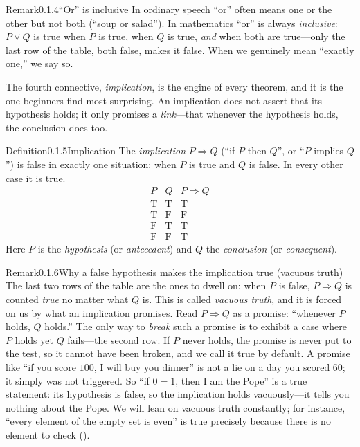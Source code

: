 \documentclass[main.tex]{subfiles}
\begin{document}
\begin{ObjL}{Remark}{0.1.4}{``Or'' is inclusive}
In ordinary speech ``or'' often means one or the other but not both (``soup or salad''). In
mathematics ``or'' is always \emph{inclusive}: $P\vee Q$ is true when $P$ is true, when $Q$ is true,
\emph{and} when both are true---only the last row of the table, both false, makes it false. When we
genuinely mean ``exactly one,'' we say so.
\end{ObjL}

\noindent The fourth connective, \emph{implication}, is the engine of every theorem, and it is the
one beginners find most surprising. An implication does not assert that its hypothesis holds; it only
promises a \emph{link}---that whenever the hypothesis holds, the conclusion does too.

\begin{Obj}{Definition}{0.1.5}{Implication}
The \emph{implication} $P\Rightarrow Q$ (``if $P$ then $Q$'', or ``$P$ implies $Q$'') is false in
exactly one situation: when $P$ is true and $Q$ is false. In every other case it is true.
\[
\begin{array}{cc|c}
P & Q & P\Rightarrow Q\\\hline
\mathrm{T}&\mathrm{T}&\mathrm{T}\\
\mathrm{T}&\mathrm{F}&\mathrm{F}\\
\mathrm{F}&\mathrm{T}&\mathrm{T}\\
\mathrm{F}&\mathrm{F}&\mathrm{T}
\end{array}
\]
Here $P$ is the \emph{hypothesis} (or \emph{antecedent}) and $Q$ the \emph{conclusion} (or
\emph{consequent}).
\end{Obj}

\begin{ObjL}{Remark}{0.1.6}{Why a false hypothesis makes the implication true (vacuous truth)}
The last two rows of the table are the ones to dwell on: when $P$ is false, $P\Rightarrow Q$ is
counted \emph{true} no matter what $Q$ is. This is called \emph{vacuous truth}, and it is forced on
us by what an implication promises. Read $P\Rightarrow Q$ as a promise: ``whenever $P$ holds, $Q$
holds.'' The only way to \emph{break} such a promise is to exhibit a case where $P$ holds yet $Q$
fails---the second row. If $P$ never holds, the promise is never put to the test, so it cannot have
been broken, and we call it true by default. A promise like ``if you score $100$, I will buy you
dinner'' is not a lie on a day you scored $60$; it simply was not triggered. So ``if $0=1$, then I am
the Pope'' is a true statement: its hypothesis is false, so the implication holds vacuously---it
tells you nothing about the Pope. We will lean on vacuous truth constantly; for instance, ``every
element of the empty set is even'' is true precisely because there is no element to check ().
\end{ObjL}
\end{document}
